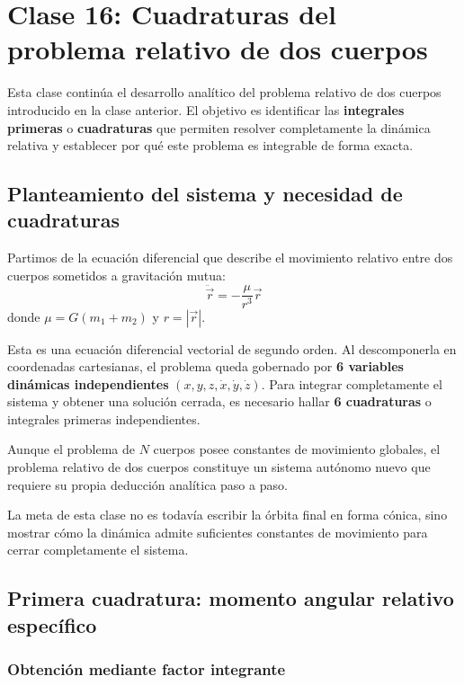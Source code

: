 \chapter{Clase 16: Cuadraturas del problema relativo de dos cuerpos}

Esta clase continúa el desarrollo analítico del problema relativo de dos cuerpos introducido en la clase anterior. El objetivo es identificar las \textbf{integrales primeras} o \textbf{cuadraturas} que permiten resolver completamente la dinámica relativa y establecer por qué este problema es integrable de forma exacta.

\section{Planteamiento del sistema y necesidad de cuadraturas}
Partimos de la ecuación diferencial que describe el movimiento relativo entre dos cuerpos sometidos a gravitación mutua:
\[
\ddot{\vec{r}} = -\frac{\mu}{r^3}\vec{r}
\]
donde \(\mu = G(m_1 + m_2)\) y \(r = |\vec{r}|\).

Esta es una ecuación diferencial vectorial de segundo orden. Al descomponerla en coordenadas cartesianas, el problema queda gobernado por \textbf{6 variables dinámicas independientes} \((x, y, z, \dot{x}, \dot{y}, \dot{z})\). Para integrar completamente el sistema y obtener una solución cerrada, es necesario hallar \textbf{6 cuadraturas} o integrales primeras independientes.

Aunque el problema de \(N\) cuerpos posee constantes de movimiento globales, el problema relativo de dos cuerpos constituye un sistema autónomo nuevo que requiere su propia deducción analítica paso a paso.

\begin{importante}
La meta de esta clase no es todavía escribir la órbita final en forma cónica, sino mostrar cómo la dinámica admite suficientes constantes de movimiento para cerrar completamente el sistema.
\end{importante}

\section{Primera cuadratura: momento angular relativo específico}
\subsection{Obtención mediante factor integrante}

